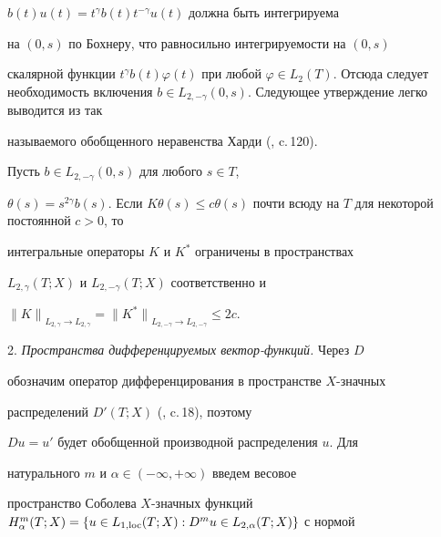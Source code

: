 $b(t)u(t)=t^\gamma b(t) t^{-\gamma} u(t)$ должна быть интегрируема


на $(0,s)$ по Бохнеру, что равносильно интегрируемости на $(0,s)$


скалярной функции $t^\gamma b(t)\varphi(t)$ при любой $\varphi \in


L_2(T)$. Отсюда следует необходимость включения $b \in


L_{2,-\gamma}(0,s)$. Следующее утверждение легко выводится из так


называемого обобщенного неравенства Харди (\cite{Sobolev}, c.\,120).





\begin{lems}


\label{KK*}


Пусть $b \in L_{2,-\gamma}(0,s)$ для любого $s \in T$,


$\theta(s) =s^{2\gamma}b(s)$. Если $K\theta(s) \le c


\theta(s)$ почти всюду на $T$ для некоторой постоянной $c>0$, то


интегральные операторы $K$ и $K^*$ ограничены в пространствах


$L_{2,\gamma}(T;X)$ и $L_{2,-\gamma}(T;X)$ соответственно и


${\|K\|}_{L_{2,\gamma} \to L_{2,\gamma}} =


{\|K^*\|}_{L_{2,-\gamma} \to L_{2,-\gamma}} \le 2c$.


\end{lems}








2. {\it Пространства дифференцируемых вектор-функций.} Через $D$


обозначим оператор дифференцирования в пространстве $X$-значных


распределений $D'(T;X)$ (\cite{LionsMagenes}, c.\,18), поэтому


$Du=u'$ будет обобщенной производной распределения $u$. Для


натурального $m$ и $\alpha \in(-\infty,+\infty)$ введем весовое


пространство Соболева $X$-значных функций $H_{\alpha}^m(T;X)=\{u


\in L_{1,\loc}(T;X):D^m u \in L_{2,\alpha}(T;X)\}$  с нормой 


$$


